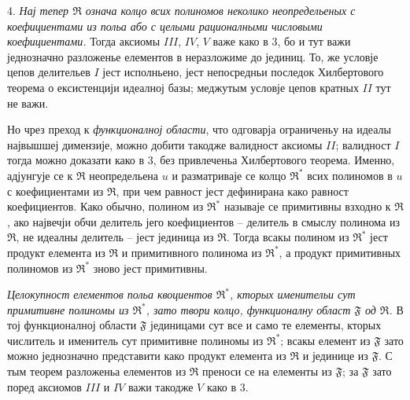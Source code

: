 ﻿\documentclass[11pt]{article}
\providecommand{\mR}{\mathfrak{R}}
\providecommand{\mF}{\mathfrak{F}}
\begin{document}
4. {\itshape Нај тепер $\mR$ означа колцо всих полиномов неколико неопредельеных с коефициентами из польа або с целыми рационалными числовыми коефициентами.} Тогда аксиомы $III$, $IV$, $V$ важе како в 3, бо и тут важи једнозначно разложенье елементов в неразложиме до јединиц. То, же условје цепов делительев $I$ јест исполньено, јест непосредньи последок Хилбертового теорема о ексистенцији идеалној базы; меджутым условје цепов кратных $II$ тут не важи.

Но чрез преход к \emph{функционалној области}, что одговарја ограниченьу на идеалы највышшеј димензије, можно добити такодже валидност аксиомы $II$; валидност $I$ тогда можно доказати како в 3, без привлеченьа Хилбертового теорема. Именно, адјунгује се к $\mR$ неопредельена $u$ и разматриваје се колцо $\mR^*$ всих полиномов в $u$ с коефициентами из $\mR$, при чем равност јест дефинирана како равност коефициентов. Како обычно, полином из $\mR^*$ называје се примитивны взходно к $\mR$, ако највечји обчи делитель јего коефициентов -- делитель в смыслу полинома из $\mR$, не идеалны делитель -- јест јединица из $\mR$. Тогда всакы полином из $\mR^*$ јест продукт елемента из $\mR$ и примитивного полинома из $\mR^*$, а продукт примитивных полиномов из $\mR^*$ зново јест примитивны.

\emph{Целокупност елементов польа квоциентов $\mR^*$, кторых именительи сут примитивне полиномы из $\mR^*$, зато твори колцо, функционалну област $\mF$ од $\mR$.} В тој функционалној области $\mF$ јединицами сут все и само те елементы, кторых числитель и именитель сут примитивне полиномы из $\mR^*$; всакы елемент из $\mF$ зато можно једнозначно представити како продукт елемента из $\mR$ и јединице из $\mF$. С тым теорем разложеньа елементов из $\mR$ преноси се на елементы из $\mF$; за $\mF$ зато поред аксиомов $III$ и $IV$ важи такодже $V$ како в 3.
\end{document}

